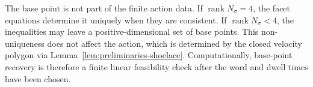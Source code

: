 \begin{remark}
The base point is not part of the finite action data. If
\(\operatorname{rank}N_\sigma=4\), the facet equations determine it uniquely
when they are consistent. If \(\operatorname{rank}N_\sigma<4\), the inequalities
may leave a positive-dimensional set of base points. This non-uniqueness does
not affect the action, which is determined by the closed velocity polygon via
Lemma~\ref{lem:preliminaries-shoelace}. Computationally, base-point recovery is
therefore a finite linear feasibility check after the word and dwell times have
been chosen.
\end{remark}
